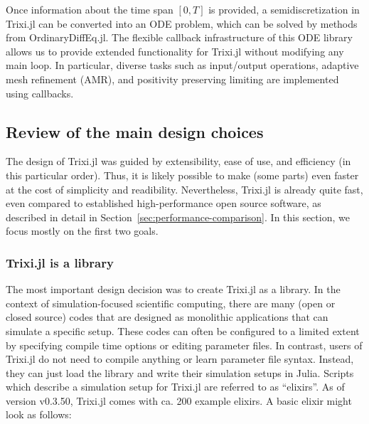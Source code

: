 \documentclass{juliacon}
\makeatletter
\newcommand{\ca}[0]{{ca.\@}\xspace}
\newcommand{\trixi}{Trixi.jl\xspace}
\makeatother
\begin{document}
Once information about the time span $[0, T]$ is provided, a semidiscretization
in \trixi can be converted into an ODE problem, which can be solved by methods 
from OrdinaryDiffEq.jl. The flexible callback infrastructure of this ODE library
allows us to provide extended functionality for \trixi without modifying any
main loop. In particular, diverse tasks such as input/output operations, adaptive
mesh refinement (AMR), and positivity preserving limiting are implemented using
callbacks.


\subsection{Review of the main design choices}

The design of \trixi was guided by extensibility, ease of use, and efficiency
(in this particular order). Thus, it is likely possible to make (some parts) even 
faster at the cost of simplicity and readibility. Nevertheless, \trixi is already quite
fast, even compared to established high-performance open source software,
as described in detail in Section~\ref{sec:performance-comparison}. In this
section, we focus mostly on the first two goals.

\subsubsection{\trixi is a library}

The most important design decision was to create \trixi as a library. In the
context of simulation-focused scientific computing, there are many (open
or closed source) codes that are designed as monolithic applications that can
simulate a specific setup. These codes can often be configured to a limited extent 
by specifying compile time options or editing parameter files. In contrast, users of 
\trixi do not need to compile anything or learn parameter file syntax. Instead, they can
just load the library and write their simulation setups in Julia. Scripts which describe
a simulation setup for \trixi are referred to as ``elixirs''. As of version v0.3.50, \trixi
comes with \ca 200 example elixirs. A basic elixir might look as follows:
\end{document}
